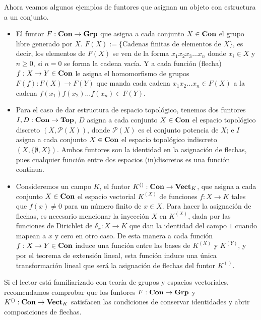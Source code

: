 \documentclass{comunicaciones}
\begin{document}
\begin{ej}\label{funtores libres}
    Ahora veamos algunos ejemplos de funtores que asignan un objeto con estructura a un conjunto.
    \begin{itemize}
        \item El funtor $F:\mathbf{Con}\to\mathbf{Grp}$ que asigna a cada conjunto $X\in\mathbf{Con}$ el grupo libre generado por $X$. $F(X):=\{\text{Cadenas finitas de elementos de }X\}$,
        es decir, los elementos de $F(X)$ se ven de la forma $x_1x_2x_3\ldots x_n$ donde $x_i\in X$ y $n\geq 0$, si $n=0$ se forma la cadena vacía. Y a cada
        función (flecha) $f:X\to Y\in\mathbf{Con}$ le asigna el homomorfismo de grupos $F(f):F(X)\to F(Y)$ que manda cada cadena $x_1x_2\ldots x_n\in F(X)$ a la cadena
        $f(x_1)f(x_2)\ldots f(x_n)\in F(Y)$.
        \item Para el caso de dar estructura de espacio topológico, tenemos dos funtores $I,D:\mathbf{Con}\to\mathbf{Top}$, $D$ asigna a cada conjunto $X\in\mathbf{Con}$ el espacio 
        topológico discreto $(X,\mathcal{P}(X))$, donde $\mathcal{P}(X)$ es el conjunto potencia de $X$; e $I$ asigna a cada conjunto $X\in\mathbf{Con}$ el espacio
        topológico indiscreto $(X,\{\emptyset,X\})$. Ambos funtores son la identidad en la asignación de flechas, pues cualquier función entre dos espacios 
        (in)discretos es una función continua.
        \item Consideremos un campo $K$, el funtor $K^{()}:\mathbf{Con}\to\mathbf{Vect}_K$, que asigna a cada conjunto $X\in\mathbf{Con}$ el espacio vectorial $K^{(X)}$ de
        funciones $f:X\to K$ tales que $f(x)\not=0$ para un número finito de $x\in X$. Para hacer la asignación de flechas, es necesario mencionar la inyección
        $X$ en $K^{(X)}$, dada por las funciones de Dirichlet de $\delta_x:X\to K$ que dan la identidad del campo $1$ cuando mapean a $x$ y cero en otro caso.
        De esta manera a cada función $f:X\to Y\in\mathbf{Con}$ induce una función entre las bases de $K^{(X)}$ y $K^{(Y)}$, y por el teorema de extensión lineal,
        esta función induce una única transformación lineal que será la asignación de flechas del funtor $K^{()}$.
    \end{itemize}
\end{ej}

Si el lector está familiarizado con teoría de grupos y espacios vectoriales, recomendamos comprobar que los funtores $F:\mathbf{Con}\to\mathbf{Grp}$ y $K^{()}:\mathbf{Con}\to\mathbf{Vect}_K$ 
satisfacen las condiciones de conservar identidades y abrir composiciones de flechas.
\end{document}
